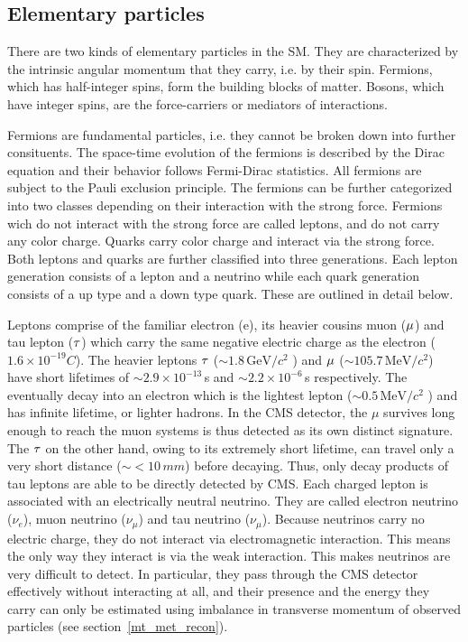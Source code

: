 \subsection{Elementary particles}
There are two kinds of elementary particles in the SM. They are characterized by the intrinsic angular momentum that they carry, i.e. by their spin. Fermions, which has half-integer spins, form the building blocks of matter. Bosons, which have integer spins, are the force-carriers or mediators of interactions.

Fermions are fundamental particles, i.e. they cannot be broken down into further consituents. The space-time evolution of the fermions is described by the Dirac equation and their behavior follows Fermi-Dirac statistics. All fermions are subject to the Pauli exclusion principle. The fermions can be further categorized into two classes depending on their interaction with the strong force. Fermions wich do not interact with the strong force are called leptons, and do not carry any color charge. Quarks carry color charge and interact via the strong force. Both leptons and quarks are further classified into three generations. Each lepton generation consists of a lepton and a neutrino while each quark generation consists of a up type and a down type quark. These are outlined in detail below.

Leptons comprise of the familiar electron (e), its heavier cousins muon ($\mu$) and tau lepton ($\tau$) which carry the same negative electric charge as the electron ($1.6\times10^{-19} C$).  The heavier leptons $\tau$ ($\sim 1.8\,\mathrm{GeV}/c^2$ ) and $\mu$ ($\sim 105.7\,\mathrm{MeV}/c^2$) have short lifetimes of $\sim 2.9\times 10^{-13}\,$s and $\sim 2.2\times 10^{-6}\,$s respectively. The eventually decay into an electron which is the lightest lepton ($\sim 0.5\,\mathrm{MeV}/c^2$ ) and has infinite lifetime, or lighter hadrons. In the CMS detector, the $\mu$ survives long enough to reach the muon systems is thus detected as its own distinct signature. The $\tau$ on the other hand, owing to its extremely short lifetime, can travel only a very short distance ($\sim <10\,mm$) before decaying. Thus, only decay products of tau leptons are able to be directly detected by CMS. Each charged lepton is associated with an electrically neutral neutrino. They are called electron neutrino ($\nu_e$), muon neutrino ($\nu_{\mu}$) and tau neutrino ($\nu_{\mu}$). Because neutrinos carry no electric charge, they do not interact via electromagnetic interaction. This means the only way they interact is via the weak interaction. This makes neutrinos are very difficult to detect. In particular, they pass through the CMS detector effectively without interacting at all, and their presence and the energy they carry can only be estimated using imbalance in transverse momentum of observed particles (see section~\ref{mt_met_recon}). 

